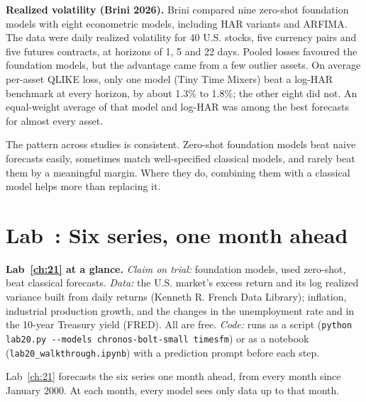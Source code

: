 \textbf{Realized volatility (Brini 2026).} Brini compared nine zero-shot foundation models with eight econometric models, including HAR variants and ARFIMA. The data were daily realized volatility for 40 U.S. stocks, five currency pairs and five futures contracts, at horizons of 1, 5 and 22 days. Pooled losses favoured the foundation models, but the advantage came from a few outlier assets. On average per-asset QLIKE loss, only one model (Tiny Time Mixers) beat a log-HAR benchmark at every horizon, by about 1.3\% to 1.8\%; the other eight did not. An equal-weight average of that model and log-HAR was among the best forecasts for almost every asset.

The pattern across studies is consistent. Zero-shot foundation models beat naive forecasts easily, sometimes match well-specified classical models, and rarely beat them by a meaningful margin. Where they do, combining them with a classical model helps more than replacing it.

\section{Lab~\thechapter: Six series, one month ahead}
\label{sec:21-lab}

\begin{callout}
\textbf{Lab~\ref{ch:21} at a glance.} \emph{Claim on trial:} foundation models, used zero-shot, beat classical forecasts. \emph{Data:} the U.S. market's excess return and its log realized variance built from daily returns (Kenneth R. French Data Library); inflation, industrial production growth, and the changes in the unemployment rate and in the 10-year Treasury yield (FRED). All are free. \emph{Code:} runs as a script (\texttt{python lab20.py -{}-models chronos-bolt-small timesfm}) or as a notebook (\texttt{lab20\_walkthrough.ipynb}) with a prediction prompt before each step.
\end{callout}

Lab~\ref{ch:21} forecasts the six series one month ahead, from every month since January 2000. At each month, every model sees only data up to that month.

